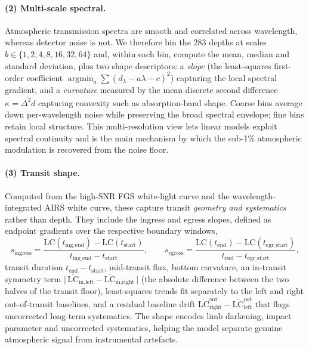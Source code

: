 \documentclass[12pt]{article}
\begin{document}
\paragraph{(2) Multi-scale spectral.} Atmospheric transmission spectra are smooth and correlated across wavelength, whereas detector noise is not. We therefore bin the 283 depths at scales $b \in \{1,2,4,8,16,32,64\}$ and, within each bin, compute the mean, median and standard deviation, plus two shape descriptors: a \emph{slope} (the least-squares first-order coefficient $\operatorname*{argmin}_a \sum (d_\lambda - a\lambda - c)^2$) capturing the local spectral gradient, and a \emph{curvature} measured by the mean discrete second difference $\kappa = \overline{\Delta^2 d}$ capturing convexity such as absorption-band shape. Coarse bins average down per-wavelength noise while preserving the broad spectral envelope; fine bins retain local structure. This multi-resolution view lets linear models exploit spectral continuity and is the main mechanism by which the sub-1\% atmospheric modulation is recovered from the noise floor.

\paragraph{(3) Transit shape.} Computed from the high-SNR FGS white-light curve and the wavelength-integrated AIRS white curve, these capture transit \emph{geometry and systematics} rather than depth. They include the ingress and egress slopes, defined as endpoint gradients over the respective boundary windows,
\[
s_{\text{ingress}} = \frac{\mathrm{LC}(t_{\text{ing\_end}}) - \mathrm{LC}(t_{\text{start}})}{t_{\text{ing\_end}} - t_{\text{start}}},\qquad
s_{\text{egress}} = \frac{\mathrm{LC}(t_{\text{end}}) - \mathrm{LC}(t_{\text{egr\_start}})}{t_{\text{end}} - t_{\text{egr\_start}}},
\]
transit duration $t_{\text{end}}-t_{\text{start}}$, mid-transit flux, bottom curvature, an in-transit symmetry term $\big|\,\overline{\mathrm{LC}}_{\text{in,left}} - \overline{\mathrm{LC}}_{\text{in,right}}\,\big|$ (the absolute difference between the two halves of the transit floor), least-squares trends fit separately to the left and right out-of-transit baselines, and a residual baseline drift $\overline{\mathrm{LC}}^{\text{oot}}_{\text{right}} - \overline{\mathrm{LC}}^{\text{oot}}_{\text{left}}$ that flags uncorrected long-term systematics. The shape encodes limb darkening, impact parameter and uncorrected systematics, helping the model separate genuine atmospheric signal from instrumental artefacts.
\end{document}
